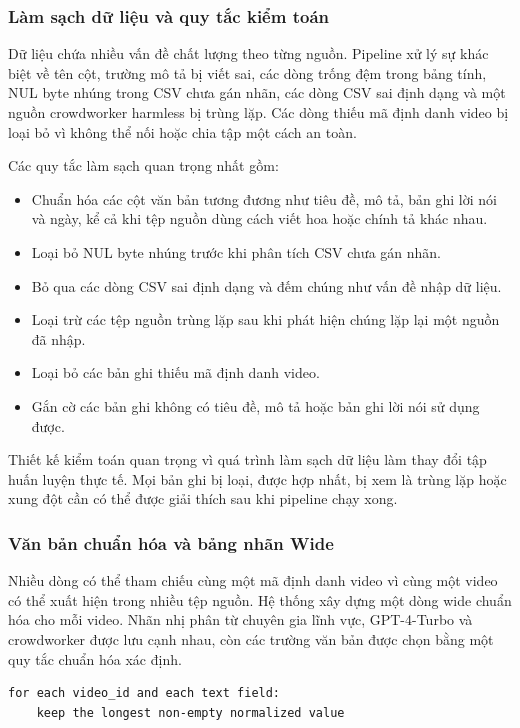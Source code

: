 \subsubsection{Làm sạch dữ liệu và quy tắc kiểm toán}

Dữ liệu chứa nhiều vấn đề chất lượng theo từng nguồn. Pipeline xử lý sự khác biệt về tên cột, trường mô tả bị viết sai, các dòng trống đệm trong bảng tính, NUL byte nhúng trong CSV chưa gán nhãn, các dòng CSV sai định dạng và một nguồn crowdworker harmless bị trùng lặp. Các dòng thiếu mã định danh video bị loại bỏ vì không thể nối hoặc chia tập một cách an toàn.

Các quy tắc làm sạch quan trọng nhất gồm:

\begin{itemize}
    \item Chuẩn hóa các cột văn bản tương đương như tiêu đề, mô tả, bản ghi lời nói và ngày, kể cả khi tệp nguồn dùng cách viết hoa hoặc chính tả khác nhau.
    \item Loại bỏ NUL byte nhúng trước khi phân tích CSV chưa gán nhãn.
    \item Bỏ qua các dòng CSV sai định dạng và đếm chúng như vấn đề nhập dữ liệu.
    \item Loại trừ các tệp nguồn trùng lặp sau khi phát hiện chúng lặp lại một nguồn đã nhập.
    \item Loại bỏ các bản ghi thiếu mã định danh video.
    \item Gắn cờ các bản ghi không có tiêu đề, mô tả hoặc bản ghi lời nói sử dụng được.
\end{itemize}

Thiết kế kiểm toán quan trọng vì quá trình làm sạch dữ liệu làm thay đổi tập huấn luyện thực tế. Mọi bản ghi bị loại, được hợp nhất, bị xem là trùng lặp hoặc xung đột cần có thể được giải thích sau khi pipeline chạy xong.

\subsubsection{Văn bản chuẩn hóa và bảng nhãn Wide}

Nhiều dòng có thể tham chiếu cùng một mã định danh video vì cùng một video có thể xuất hiện trong nhiều tệp nguồn. Hệ thống xây dựng một dòng wide chuẩn hóa cho mỗi video. Nhãn nhị phân từ chuyên gia lĩnh vực, GPT-4-Turbo và crowdworker được lưu cạnh nhau, còn các trường văn bản được chọn bằng một quy tắc chuẩn hóa xác định.

\begin{verbatim}
for each video_id and each text field:
    keep the longest non-empty normalized value
\end{verbatim}

